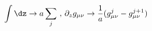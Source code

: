 \begin{equation}
\int \dz \to a \sum_j \, \, , \,  \partial_z g_{\mu \nu} \to \frac{1}{a}
(g^j_{\mu \nu} - g^{j+1}_{\mu \nu}) \label{contints}
\end{equation}


